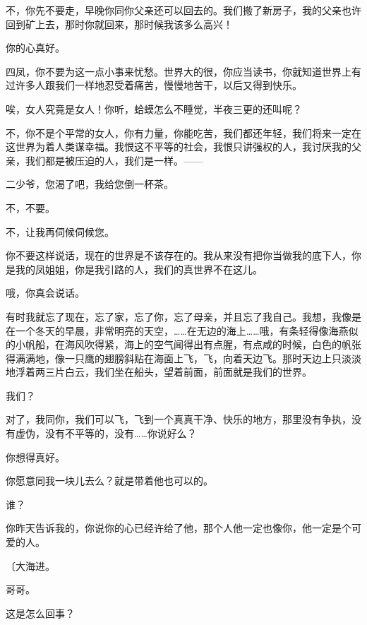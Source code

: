 不，你先不要走，早晚你同你父亲还可以回去的。我们搬了新房子，我的父亲也许回到矿上去，那时你就回来，那时候我该多么高兴！

你的心真好。

四凤，你不要为这一点小事来忧愁。世界大的很，你应当读书，你就知道世界上有过许多人跟我们一样地忍受着痛苦，慢慢地苦干，以后又得到快乐。

唉，女人究竟是女人！你听，蛤蟆怎么不睡觉，半夜三更的还叫呢？

不，你不是个平常的女人，你有力量，你能吃苦，我们都还年轻，我们将来一定在这世界为着人类谋幸福。我恨这不平等的社会，我恨只讲强权的人，我讨厌我的父亲，我们都是被压迫的人，我们是一样。——

二少爷，您渴了吧，我给您倒一杯茶。

不，不要。

不，让我再伺候伺候您。

你不要这样说话，现在的世界是不该存在的。我从来没有把你当做我的底下人，你是我的凤姐姐，你是我引路的人，我们的真世界不在这儿。

哦，你真会说话。

有时我就忘了现在，忘了家，忘了你，忘了母亲，并且忘了我自己。我想，我像是在一个冬天的早晨，非常明亮的天空，……在无边的海上……哦，有条轻得像海燕似的小帆船，在海风吹得紧，海上的空气闻得出有点腥，有点咸的时候，白色的帆张得满满地，像一只鹰的翅膀斜贴在海面上飞，飞，向着天边飞。那时天边上只淡淡地浮着两三片白云，我们坐在船头，望着前面，前面就是我们的世界。

我们？

对了，我同你，我们可以飞，飞到一个真真干净、快乐的地方，那里没有争执，没有虚伪，没有不平等的，没有……你说好么？

你想得真好。

你愿意同我一块儿去么？就是带着他也可以的。

谁？

你昨天告诉我的，你说你的心已经许给了他，那个人他一定也像你，他一定是个可爱的人。

{\fangsong〔大海进。}

哥哥。

这是怎么回事？


